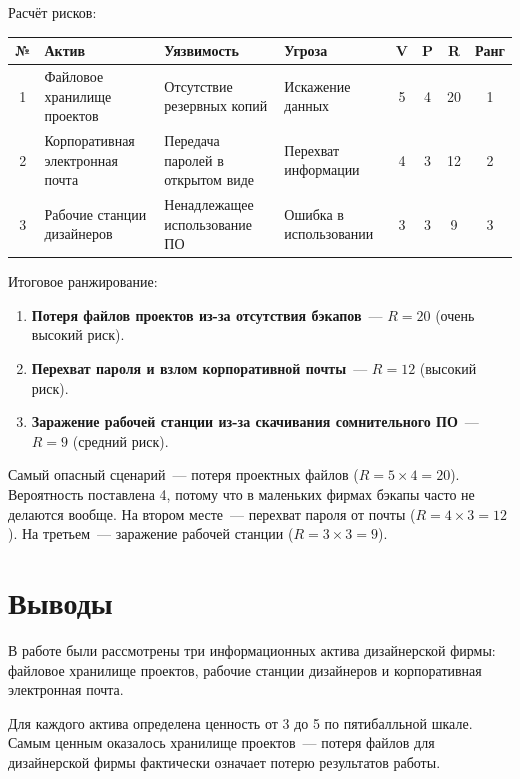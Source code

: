 \documentclass[a4paper,14pt]{extarticle}
\begin{document}
Расчёт рисков:

\begin{center}
\begin{tabularx}{\textwidth}{|c|X|X|X|c|c|c|c|}
\hline
\textbf{№} & \textbf{Актив} & \textbf{Уязвимость} & \textbf{Угроза} & \textbf{V} & \textbf{P} & \textbf{R} & \textbf{Ранг} \\
\hline
1 & Файловое хранилище проектов & Отсутствие резервных копий & Искажение данных & 5 & 4 & 20 & 1 \\
\hline
2 & Корпоративная электронная почта & Передача паролей в открытом виде & Перехват информации & 4 & 3 & 12 & 2 \\
\hline
3 & Рабочие станции дизайнеров & Ненадлежащее использование ПО & Ошибка в использовании & 3 & 3 & 9 & 3 \\
\hline
\end{tabularx}
\end{center}

\vspace{3mm}

Итоговое ранжирование:

\begin{enumerate}[label=\textbf{\arabic*.}]
\item \textbf{Потеря файлов проектов из-за отсутствия бэкапов}~--- $R = 20$ (очень высокий риск).
\item \textbf{Перехват пароля и взлом корпоративной почты}~--- $R = 12$ (высокий риск).
\item \textbf{Заражение рабочей станции из-за скачивания сомнительного ПО}~--- $R = 9$ (средний риск).
\end{enumerate}

Самый опасный сценарий~--- потеря проектных файлов ($R = 5 \times 4 = 20$). Вероятность поставлена 4, потому что в маленьких фирмах бэкапы часто не делаются вообще. На втором месте~--- перехват пароля от почты ($R = 4 \times 3 = 12$). На третьем~--- заражение рабочей станции ($R = 3 \times 3 = 9$).

\section{Выводы}

В работе были рассмотрены три информационных актива дизайнерской фирмы: файловое хранилище проектов, рабочие станции дизайнеров и корпоративная электронная почта.

Для каждого актива определена ценность от 3 до 5 по пятибалльной шкале. Самым ценным оказалось хранилище проектов~--- потеря файлов для дизайнерской фирмы фактически означает потерю результатов работы.
\end{document}
